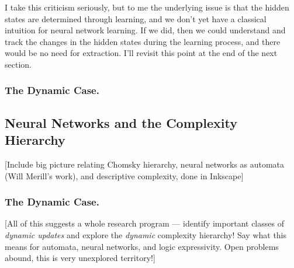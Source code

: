 \documentclass[letterpaper]{article}
\begin{document}
I take this criticism seriously, but to me the underlying issue is that the hidden states are determined through learning, and we don't yet have a classical intuition for neural network learning.  If we did, then we could understand and track the changes in the hidden states during the learning process, and there would be no need for extraction.  I'll revisit this point at the end of the next section.

\subsubsection*{The Dynamic Case.}

\subsection*{Neural Networks and the Complexity Hierarchy}

[Include big picture relating Chomsky hierarchy, neural networks as automata (Will Merill's work), and descriptive complexity, done in Inkscape]

\subsubsection*{The Dynamic Case.}

[All of this suggests a whole research program --- identify important classes of \emph{dynamic updates} and explore the \emph{dynamic} complexity hierarchy! Say what this means for automata, neural networks, and logic expressivity.  Open problems abound, this is very unexplored territory!]

\printbibliography
\end{document}
